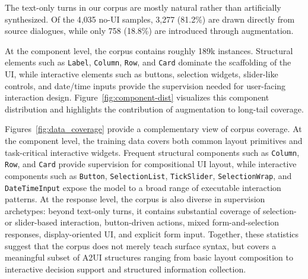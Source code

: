 \documentclass{llmxive}
\begin{document}
The text-only turns in our corpus are mostly natural rather than artificially synthesized. Of the 4{,}035 no-UI samples, 3{,}277 (81.2\%) are drawn directly from source dialogues, while only 758 (18.8\%) are introduced through augmentation.

At the component level, the corpus contains roughly 189k instances. Structural elements such as \texttt{Label}, \texttt{Column}, \texttt{Row}, and \texttt{Card} dominate the scaffolding of the UI, while interactive elements such as buttons, selection widgets, slider-like controls, and date/time inputs provide the supervision needed for user-facing interaction design. 
Figure~\ref{fig:component-dist} visualizes this component distribution and highlights the contribution of augmentation to long-tail coverage.

Figures~\ref{fig:data_coverage} provide a complementary view of corpus coverage. At the component level, the training data covers both common layout primitives and task-critical interactive widgets. Frequent structural components such as \texttt{Column}, \texttt{Row}, and \texttt{Card} provide supervision for compositional UI layout, while interactive components such as \texttt{Button}, \texttt{SelectionList}, \texttt{TickSlider}, \texttt{SelectionWrap}, and \texttt{DateTimeInput} expose the model to a broad range of executable interaction patterns. At the response level, the corpus is also diverse in supervision archetypes: beyond text-only turns, it contains substantial coverage of selection- or slider-based interaction, button-driven actions, mixed form-and-selection responses, display-oriented UI, and explicit form input. Together, these statistics suggest that the corpus does not merely teach surface syntax, but covers a meaningful subset of A2UI structures ranging from basic layout composition to interactive decision support and structured information collection.



\end{document}
